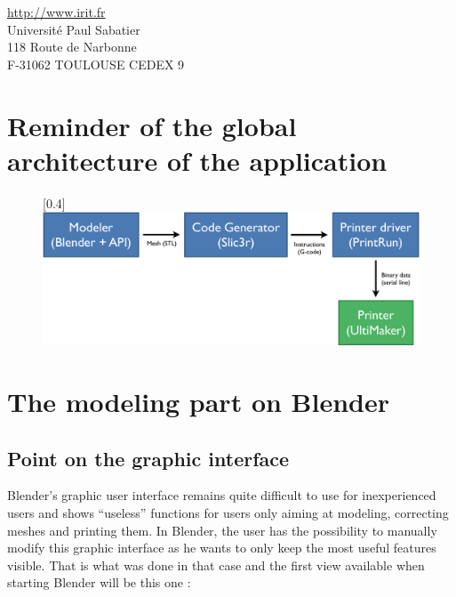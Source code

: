 \documentclass{article}
\begin{document}
\begin{center}
\url{http://www.irit.fr}\\
Université Paul Sabatier \\
118 Route de Narbonne \\
F-31062 TOULOUSE CEDEX 9
\end{center}

\thispagestyle{empty}

\newpage

\tableofcontents

\newpage

\section{Reminder of the global architecture of the application}


\begin{figure}[!h]
\begin{center}
\scalebox{0.4}[0.4]{\includegraphics{./Images/schema}}
\end{center}
\end{figure}

\newpage

\section{The modeling part on Blender}

\subsection{Point on the graphic interface}

Blender's graphic user interface remains quite difficult to use for inexperienced users and shows ``useless'' functions for users only aiming at modeling, correcting meshes and printing them. In Blender, the user has the possibility to manually modify this graphic interface as he wants to only keep the most useful features visible. That is what was done in that case and the first view available when starting Blender will be this one : 
\bigskip
\bigskip
\end{document}
